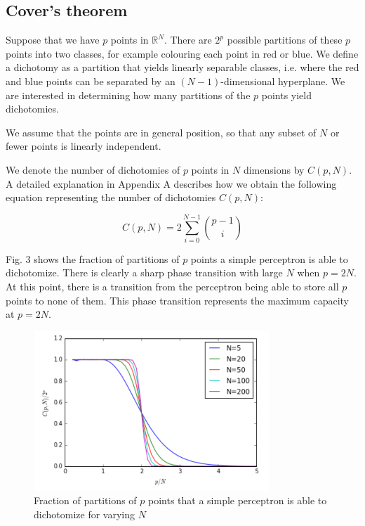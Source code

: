 \documentclass[a4paper, 11pt]{article}
\begin{document}
\subsection{Cover's theorem}

Suppose that we have $p$ points in $\mathbb{R}^N$. There are $2^p$ possible partitions of these $p$ points into two classes, for example colouring each point in red or blue. We define a dichotomy as a partition that yields linearly separable classes, i.e. where the red and blue points can be separated by an $(N-1)$-dimensional hyperplane. We are interested in determining how many partitions of the $p$ points yield dichotomies.

We assume that the points are in general position, so that any subset of $N$ or fewer points is linearly independent.

We denote the number of dichotomies of $p$ points in $N$ dimensions by $C(p, N)$. A detailed explanation in Appendix A describes how we obtain the following equation representing the number of dichotomies $C(p, N)$:

\begin{equation}
    C(p, N) = 2 \sum_{i=0}^{N-1} \binom{p-1}{i}
\end{equation}

Fig. 3 shows the fraction of partitions of $p$ points a simple perceptron is able to dichotomize. There is clearly a sharp phase transition with large $N$ when $p = 2N$. At this point, there is a transition from the perceptron being able to store all $p$ points to none of them. This phase transition represents the maximum capacity at $p = 2N$.

\begin{center}
\begin{figure}[thbp]
    \centering
    \captionsetup{justification=centering, font=small, margin=0.5cm}
    \includegraphics[height=6cm]{images/capacity-graph.png}
    \caption{Fraction of partitions of $p$ points that a simple perceptron is able to dichotomize for varying $N$}
\end{figure}
\end{center}
\end{document}
